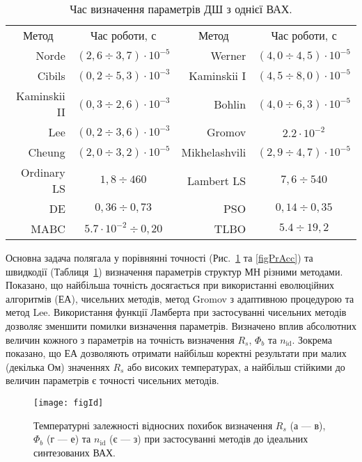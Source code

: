 \begin{table}[b]
\caption{\label{tabRT}Час визначення параметрів ДШ з однієї ВАХ.}
\centering
\begin{tabular}{|r|c|r|c|}
\hline
\multicolumn{1}{|c|}{Метод}&Час роботи, с &\multicolumn{1}{c|}{Метод}&Час роботи, с\\ \hhline{|====|}
Norde &$(2,6\div3,7)\cdot10^{-5}$& Werner  &$(4,0\div4,5)\cdot10^{-5}$\\ \hline
Cibils  &$(0,2\div5,3)\cdot10^{-3}$& Kaminskii I &$(4,5\div8,0)\cdot10^{-5}$\\ \hline
Kaminskii II &$(0,3\div2,6)\cdot10^{-3}$& Bohlin &$(4,0\div6,3)\cdot10^{-5}$\\ \hline
Lee &$(0,2\div3,6)\cdot10^{-3}$& Gromov &$2.2\cdot10^{-2}$\\ \hline
Cheung &$(2,0\div3,2)\cdot10^{-5}$&Mikhelashvili &$(2,9\div4,7)\cdot10^{-5}$\\ \hline
Ordinary LS &$1,8\div460$&Lambert LS &$7,6\div540$\\ \hline
DE &$0,36\div0,73$&PSO &$0,14\div0,35$\\ \hline
MABC &$5.7\cdot10^{-2}\div0,20$&TLBO &$5.4\div19,2$ \\
\hline
\end{tabular}
\end{table}

Основна задача полягала у порівнянні точності (Рис.~\ref{figId} та \ref{figPrAcc}) та швидкодії (Таблиця~\ref{tabRT}) визначення параметрів структур МН різними методами.
Показано, що найбільша точність досягається при використанні еволюцiйних алгоритмів (ЕА), чисельних методів, метод Gromov з адаптивною процедурою та метод Lee.
Використання функції Ламберта при застосуванні чисельних методів дозволяє зменшити помилки визначення параметрів.
Визначено вплив абсолютних величин кожного з параметрів на точність визначення $R_s$, $\Phi_b$ та $n_\mathrm{id}$.
Зокрема показано, що ЕА дозволяють отримати найбільш коректні результати при малих (декілька Ом) значеннях $R_s$ або високих температурах, а найбільш стійкими до величин параметрів є точності чисельних методів.


\begin{figure}
\center
\texttt{[image: figId]}%
\caption{\label{figId}
Температурні залежності відносних похибок визначення $R_s$ (а --- в), $\Phi_b$ (г --- е) та $n_\mathrm{id}$ (є --- з) при застосуванні методів до ідеальних синтезованих ВАХ.
}
\end{figure}

